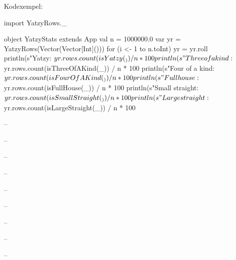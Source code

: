 Kodexempel:
\begin{CodeSmall}
import YatzyRows._

object YatzyStats extends App {
  val n = 1000000.0
  var yr = YatzyRows(Vector(Vector[Int]()))
  for (i <- 1 to n.toInt) yr = yr.roll
  println(s"Yatzy: ${yr.rows.count(isYatzy(_)) / n * 100}%
  println(s"Three of a kind: ${yr.rows.count(isThreeOfAKind(_)) / n * 100}%
  println(s"Four of a kind: ${yr.rows.count(isFourOfAKind(_)) / n * 100}%
  println(s"Full house: ${yr.rows.count(isFullHouse(_)) / n * 100}%
  println(s"Small straight: ${yr.rows.count(isSmallStraight(_)) / n * 100}%
  println(s"Large straight: ${yr.rows.count(isLargeStraight(_)) / n * 100}%
}
\end{CodeSmall}

\Subtask --

\AdvancedTasks %

\Task     %

\Subtask -- %


\Task     %

\Subtask -- %

\Subtask -- %

\Subtask -- %

\Subtask -- %

\Subtask -- %

\Subtask -- %


\Task     %

\Subtask -- %
